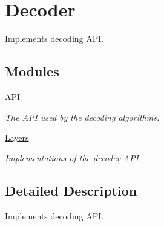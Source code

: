 \hypertarget{group__decoder}{\section{Decoder}
\label{group__decoder}
}


Implements decoding A\-P\-I.  


\subsection*{Modules}
\begin{DoxyCompactItemize}
\item 
\hyperlink{group__decoder__api}{A\-P\-I}
\begin{DoxyCompactList}\small\item\em The A\-P\-I used by the decoding algorithms. \end{DoxyCompactList}\item 
\hyperlink{group__decoder__layers}{Layers}
\begin{DoxyCompactList}\small\item\em Implementations of the decoder A\-P\-I. \end{DoxyCompactList}\end{DoxyCompactItemize}


\subsection{Detailed Description}
Implements decoding A\-P\-I. 